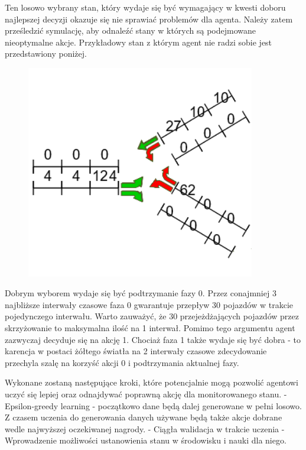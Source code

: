 \documentclass[12pt]{book}
\theoremstyle{plain}
\begin{document}
Ten losowo wybrany stan, który wydaje się być wymagający w kwesti doboru najlepszej decyzji okazuje się nie sprawiać problemów dla agenta. Należy zatem prześledzić symulację, aby odnaleźć stany w których są podejmowane nieoptymalne akcje. Przykładowy stan z którym agent nie radzi sobie jest przedstawiony poniżej. 

\begin{figure}[H]
	\centering
	\includegraphics[width=10cm]{env4_3_monitorowany_stan.png}
	\label{fig:	env4_3_monitorowany_stan.png}
\end{figure}

Dobrym wyborem wydaje się być podtrzymanie fazy 0. Przez conajmniej 3 najbliższe interwały czasowe faza 0 gwarantuje przepływ 30 pojazdów w trakcie pojedynczego interwału. Warto zauważyć, że 30 przejeżdżających pojazdów przez skrzyżowanie to maksymalna ilość na 1 interwał. Pomimo tego argumentu agent zazwyczaj decyduje się na akcję 1. Chociaż faza 1 także wydaje się być dobra - to karencja w postaci żółtego światła na 2 interwały czasowe zdecydowanie przechyla szalę na korzyść akcji 0 i podtrzymania aktualnej fazy.



Wykonane zostaną następujące kroki, które potencjalnie mogą pozwolić agentowi uczyć się lepiej oraz odnajdywać poprawną akcję dla monitorowanego stanu.
- Epsilon-greedy learning - początkowo dane będą dalej generowane w pełni losowo. Z czasem uczenia do generowania danych używane będą także akcje dobrane wedle najwyższej oczekiwanej nagrody.
- Ciągła walidacja w trakcie uczenia
- Wprowadzenie możliwości ustanowienia stanu w środowisku i nauki dla niego.
\end{document}
